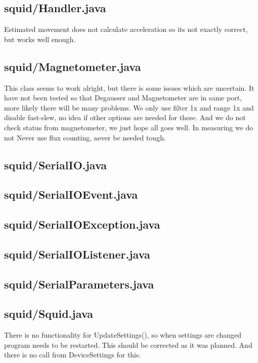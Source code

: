 \subsection{squid/Handler.java}

Estimated movement does not calculate acceleration so its not exactly correct, but works well enough.

\subsection{squid/Magnetometer.java}

This class seems to work alright, but there is some issues which are uncertain. It have not been tested so that Degausser and Magnetometer are in same port, more likely there will be many problems. We only use filter 1x and range 1x and disable fast-slew, no idea if other options are needed for these. And we do not check status from magnetometer, we just hope all goes well. In measuring we do not Never use flux counting, never be needed tough.

\subsection{squid/SerialIO.java}

\subsection{squid/SerialIOEvent.java}

\subsection{squid/SerialIOException.java}

\subsection{squid/SerialIOListener.java}

\subsection{squid/SerialParameters.java}

\subsection{squid/Squid.java}

There is no functionality for UpdateSettings(), so when settings are changed program needs to be restarted. This should be corrected as it was planned. And there is no call from DeviceSettings for this.

